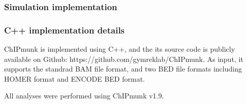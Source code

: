 \documentclass[12pt]{article}
\begin{document}
\subsubsection*{Simulation implementation}







\subsubsection*{C++ implementation details}
ChIPmunk is implemented using C++, and the its source code is publicly available on Github: https://github.com/gymreklab/ChIPmunk.
As input, it supports the standrad BAM file format, and two BED file formats including HOMER format and ENCODE BED format.

All analyses were performed using ChIPmunk v1.9. %
\end{document}

